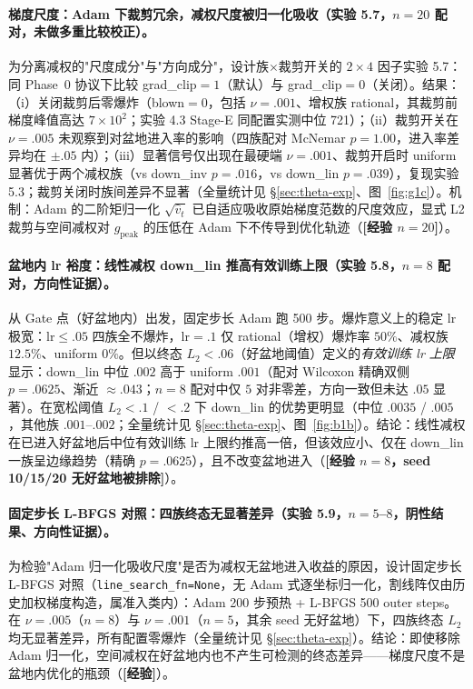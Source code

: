 \documentclass[fontset=windows,11pt]{ctexart}
\numberwithin{equation}{section}
\begin{document}
\paragraph{梯度尺度：Adam 下裁剪冗余，减权尺度被归一化吸收（实验 5.7，$n=20$ 配对，未做多重比较校正）。}
为分离减权的"尺度成分"与"方向成分"，设计族$\times$裁剪开关的 $2\times4$ 因子实验 5.7：同 Phase~0 协议下比较 grad\_clip$=1$（默认）与 grad\_clip$=0$（关闭）。结果：（i）关闭裁剪后零爆炸（blown$=0$，包括 $\nu=.001$、增权族 rational，其裁剪前梯度峰值高达 $7\times10^2$；实验 4.3 Stage-E 同配置实测中位 721）；（ii）裁剪开关在 $\nu=.005$ 未观察到对盆地进入率的影响（四族配对 McNemar $p=1.00$，进入率差异均在 $\pm.05$ 内）；（iii）显著信号仅出现在最硬端 $\nu=.001$、裁剪开启时 uniform 显著优于两个减权族（vs down\_inv $p=.016$，vs down\_lin $p=.039$），复现实验 5.3；裁剪关闭时族间差异不显著（全量统计见 \S\ref{sec:theta-exp}、图~\ref{fig:g1c}）。机制：Adam 的二阶矩归一化 $\sqrt{\hat v_t}$ 已自适应吸收原始梯度范数的尺度效应，显式 L2 裁剪与空间减权对 $g_{\text{peak}}$ 的压低在 Adam 下不传导到优化轨迹（\textbf{[经验 $n=20$]}）。

\paragraph{盆地内 lr 裕度：线性减权 down\_lin 推高有效训练上限（实验 5.8，$n=8$ 配对，方向性证据）。}
从 Gate 点（好盆地内）出发，固定步长 Adam 跑 500 步。爆炸意义上的稳定 lr 极宽：lr$\le.05$ 四族全不爆炸，lr$=.1$ 仅 rational（增权）爆炸率 $50\%$、减权族 $12.5\%$、uniform $0\%$。但以终态 $L_2<.06$（好盆地阈值）定义的\emph{有效训练 lr 上限}显示：down\_lin 中位 $.002$ 高于 uniform $.001$（配对 Wilcoxon 精确双侧 $p=.0625$、渐近 $\approx.043$；$n=8$ 配对中仅 $5$ 对非零差，方向一致但未达 $.05$ 显著）。在宽松阈值 $L_2<.1$ / $<.2$ 下 down\_lin 的优势更明显（中位 $.0035$ / $.005$，其他族 $.001$--$.002$；全量统计见 \S\ref{sec:theta-exp}、图~\ref{fig:b1b}）。结论：线性减权在已进入好盆地后中位有效训练 lr 上限约推高一倍，但该效应小、仅在 down\_lin 一族呈边缘趋势（精确 $p=.0625$），且不改变盆地进入（\textbf{[经验 $n=8$，seed 10/15/20 无好盆地被排除]}）。

\paragraph{固定步长 L-BFGS 对照：四族终态无显著差异（实验 5.9，$n=5$--$8$，阴性结果、方向性证据）。}
为检验"Adam 归一化吸收尺度"是否为减权无盆地进入收益的原因，设计固定步长 L-BFGS 对照（\texttt{line\_search\_fn=None}，无 Adam 式逐坐标归一化，割线阵仅由历史加权梯度构造，属准入类内）：Adam 200 步预热 + L-BFGS 500 outer steps。在 $\nu=.005$（$n=8$）与 $\nu=.001$（$n=5$，其余 seed 无好盆地）下，四族终态 $L_2$ 均无显著差异，所有配置零爆炸（全量统计见 \S\ref{sec:theta-exp}）。结论：即使移除 Adam 归一化，空间减权在好盆地内也不产生可检测的终态差异——梯度尺度不是盆地内优化的瓶颈（\textbf{[经验]}）。
\end{document}
